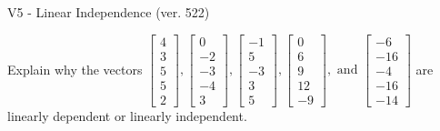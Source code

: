 \begin{exercise}
  \begin{exerciseTitle}V5 - Linear Independence (ver. 522)\end{exerciseTitle}
  \begin{exerciseStatement}
    Explain why the vectors \(\left[\begin{array}{r}
4 \\
3 \\
5 \\
5 \\
2
\end{array}\right] , \left[\begin{array}{r}
0 \\
-2 \\
-3 \\
-4 \\
3
\end{array}\right] , \left[\begin{array}{r}
-1 \\
5 \\
-3 \\
3 \\
5
\end{array}\right] , \left[\begin{array}{r}
0 \\
6 \\
9 \\
12 \\
-9
\end{array}\right] , \text{ and } \left[\begin{array}{r}
-6 \\
-16 \\
-4 \\
-16 \\
-14
\end{array}\right]\) are linearly dependent or linearly independent.	



\end{exerciseStatement}
\end{exercise}
